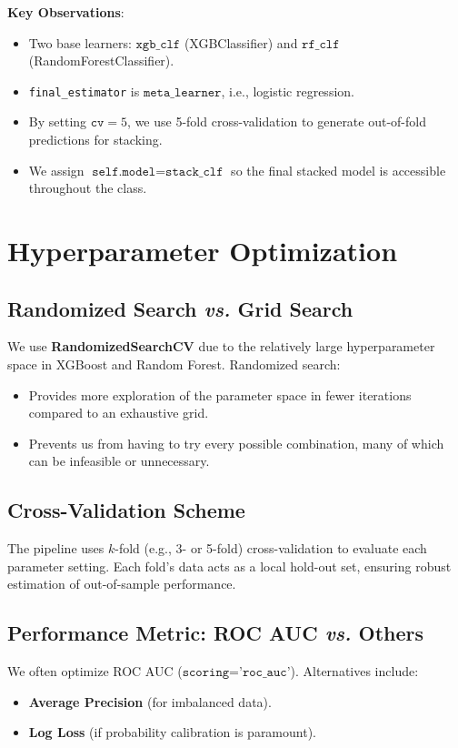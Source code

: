 \documentclass[12pt]{article}
\begin{document}
\noindent
\textbf{Key Observations}:
\begin{itemize}
    \item Two base learners: \(\texttt{xgb\_clf}\) (XGBClassifier) and \(\texttt{rf\_clf}\) (RandomForestClassifier).
    \item \texttt{final\_estimator} is \(\texttt{meta\_learner}\), i.e., logistic regression.
    \item By setting \(\texttt{cv}=5\), we use 5-fold cross-validation to generate out-of-fold predictions for stacking.
    \item We assign \(\texttt{self.model} = \texttt{stack\_clf}\) so the final stacked model is accessible throughout the class.
\end{itemize}

\section{Hyperparameter Optimization}

\subsection{Randomized Search \emph{vs.} Grid Search}
We use \textbf{RandomizedSearchCV} due to the relatively large hyperparameter space in XGBoost and Random Forest. Randomized search:
\begin{itemize}[noitemsep]
    \item Provides more exploration of the parameter space in fewer iterations compared to an exhaustive grid.
    \item Prevents us from having to try every possible combination, many of which can be infeasible or unnecessary.
\end{itemize}

\subsection{Cross-Validation Scheme}
The pipeline uses \(k\)-fold (e.g., 3- or 5-fold) cross-validation to evaluate each parameter setting. Each fold’s data acts as a local hold-out set, ensuring robust estimation of out-of-sample performance.

\subsection{Performance Metric: ROC AUC \emph{vs.} Others}
We often optimize ROC AUC (\(\texttt{scoring='roc\_auc'}\)). Alternatives include:
\begin{itemize}[noitemsep]
    \item \textbf{Average Precision} (for imbalanced data).
    \item \textbf{Log Loss} (if probability calibration is paramount).
\end{itemize}
\end{document}
